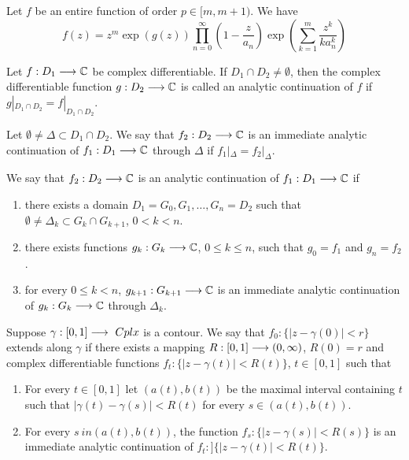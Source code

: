 \documentclass{unswmaths}
\begin{document}
\begin{theorem}
	Let $ f $ be an entire function of order $ p \in [m,m+1) $. We have
	$$
		f(z) = z^m \exp\left( g(z) \right) \prod_{n=0}^\infty \left( 1 - \frac{z}{a_n}\right) \exp\left( \sum_{k=1}^m \frac{z^k}{k a_n^k}\right)
	$$
\end{theorem}

\begin{definition}
	Let $ f : D_1 \longrightarrow \mathbb{C} $ be complex differentiable. If $ D_1 \cap D_2 \neq \emptyset $, then the complex differentiable function $ g : D_2 \longrightarrow \mathbb{C} $ is called an analytic continuation of $ f $ if $ g|_{D_1 \cap D_2} = f|_{D_1 \cap D_2} $.
\end{definition}

\begin{definition}
	Let $ \emptyset \neq \Delta \subset D_1 \cap D_2 $. We say that $ f_2 : D_2 \longrightarrow \mathbb{C} $ is an immediate analytic continuation of $ f_1 : D_1 \longrightarrow \mathbb{C} $ through $ \Delta $ if $ f_1 |_\Delta = f_2 |_\Delta $.
\end{definition}

\begin{definition}
	We say that $ f_2 : D_2 \longrightarrow \mathbb{C} $ is an analytic continuation of $ f_1 : D_1 \longrightarrow \mathbb{C} $ if 
	\begin{enumerate}
		\item there exists a domain $ D_1 = G_0, G_1, \ldots, G_n = D_2 $ such that $ \emptyset \neq \Delta_k  \subset G_k \cap G_{k+1} $, $ 0 < k < n $. \\
		\item there exists functions $ g_k : G_k \longrightarrow \mathbb{C} $, $ 0 \leq k \leq n $, such that $ g_0 = f_1 $ and $ g_n = f_2 $. \\
		\item for every $ 0 \leq k < n $, $ g_{k+1} : G_{k+1} \longrightarrow \mathbb{C} $ is an immediate analytic continuation of $ g_k : G_k \longrightarrow \mathbb{C} $ through $ \Delta_k $.
	\end{enumerate}
\end{definition}

\begin{definition}
	Suppose $ \gamma : [0,1] \longrightarrow\ Cplx $ is a contour. We say that $ f_0 : \{ |z-\gamma(0)| < r \} $ extends along $ \gamma $ if there exists a mapping $ R : [0,1] \longrightarrow (0, \infty) $, $ R(0) = r $ and complex differentiable functions $ f_t : \{|z - \gamma(t)| < R(t) \} $, $ t \in [0,1] $ such that
	\begin{enumerate}
		\item For every $ t \in [0,1] $ let $ (a(t),b(t)) $ be the maximal interval containing $ t $ such that $ |\gamma(t) - \gamma(s) | <R(t) $ for every $ s \in (a(t), b(t)) $.
		\item For every $ s\ in (a(t), b(t)) $, the function $ f_s : \{ |z - \gamma(s)| < R(s) \} $ is an immediate analytic continuation of $ f_t : ]\{ |z- \gamma(t)| <R(t) \} $.
	\end{enumerate}	 
\end{definition}
	
\end{document}
